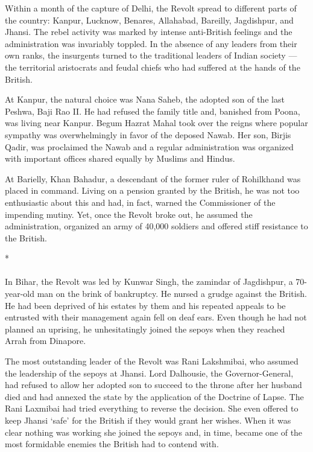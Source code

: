 Within a month of the capture of Delhi, the Revolt spread to different parts of the country: Kanpur, Lucknow, Benares, Allahabad, Bareilly, Jagdishpur, and Jhansi. The rebel activity was marked by intense anti-British feelings and the administration was invariably toppled. In the absence of any leaders from their own ranks, the insurgents turned to the traditional leaders of Indian society — the territorial aristocrats and feudal chiefs who had suffered at the hands of the British.

At Kanpur, the natural choice was Nana Saheb, the adopted son of the last Peshwa, Baji Rao II. He had refused the family title and, banished from Poona, was living near Kanpur. Begum Hazrat Mahal took over the reigns where popular sympathy was overwhelmingly in favor of the deposed Nawab. Her son, Birjis Qadir, was proclaimed the Nawab and a regular administration was organized with important offices shared equally by Muslims and Hindus.

At Barielly, Khan Bahadur, a descendant of the former ruler of Rohilkhand was placed in command. Living on a pension granted by the British, he was not too enthusiastic about this and had, in fact, warned the Commissioner of the impending mutiny. Yet, once the Revolt broke out, he assumed the administration, organized an army of 40,000 soldiers and offered stiff resistance to the British.

\begin{center}*\end{center}

\paragraph*{}
In Bihar, the Revolt was led by Kunwar Singh, the zamindar of Jagdishpur, a 70-year-old man on the brink of bankruptcy. He nursed a grudge against the British. He had been deprived of his estates by them and his repeated appeals to be entrusted with their management again fell on deaf ears. Even though he had not planned an uprising, he unhesitatingly joined the sepoys when they reached Arrah from Dinapore.

The most outstanding leader of the Revolt was Rani Lakshmibai, who assumed the leadership of the sepoys at Jhansi. Lord Dalhousie, the Governor-General, had refused to allow her adopted son to succeed to the throne after her husband died and had annexed the state by the application of the Doctrine of Lapse. The Rani Laxmibai had tried everything to reverse the decision. She even offered to keep Jhansi `safe' for the British if they would grant her wishes. When it was clear nothing was working she joined the sepoys and, in time, became one of the most formidable enemies the British had to contend with.

